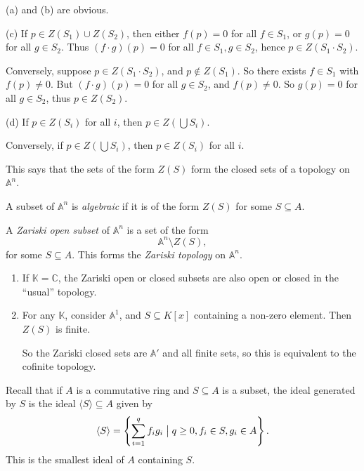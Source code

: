 \documentclass[12pt]{article}
\begin{document}
\begin{proofbox}


	(a) and (b) are obvious.

	(c) If $p \in Z(S_1) \cup Z(S_2)$, then either $f(p) = 0$ for all $f \in S_1$, or $g(p) = 0$ for all $g \in S_2$. Thus $(f \cdot g)(p) = 0$ for all $f \in S_1, g \in S_2$, hence $p \in Z(S_1 \cdot S_2)$.

	Conversely, suppose $p \in Z(S_1 \cdot S_2)$, and $p \not \in Z(S_1)$. So there exists $f \in S_1$ with $f(p) \neq 0$. But $(f \cdot g)(p) = 0$ for all $g \in S_2$, and $f(p) \neq 0$. So $g(p) = 0$ for all $g \in S_2$, thus $p \in Z(S_2)$.

	(d) If $p \in Z(S_i)$ for all $i$, then $p \in Z(\bigcup S_i)$.

	Conversely, if $p \in Z(\bigcup S_i)$, then $p \in Z(S_i)$ for all $i$.
\end{proofbox}

This says that the sets of the form $Z(S)$ form the closed sets of a topology on $\mathbb{A}^n$.

\begin{definition}
	A subset of $\mathbb{A}^n$ is \emph{algebraic} if it is of the form $Z(S)$ for some $S \subseteq A$.

	A \emph{Zariski open subset} of $\mathbb{A}^n$ is a set of the form
	\[
	\mathbb{A}^n \setminus Z(S),
	\]
	for some $S \subseteq A$. This forms the \emph{Zariski topology} on $\mathbb{A}^n$.
\end{definition}

\begin{exbox}
	\begin{enumerate}
		\item If $\mathbb{K} = \mathbb{C}$, the Zariski open or closed subsets are also open or closed in the ``usual'' topology.
		\item For any $\mathbb{K}$, consider $\mathbb{A}^1$, and $S \subseteq K[x]$ containing a non-zero element. Then $Z(S)$ is finite.

			So the Zariski closed sets are $\mathbb{A}'$ and all finite sets, so this is equivalent to the cofinite topology.
	\end{enumerate}	
\end{exbox}

Recall that if $A$ is a commutative ring and $S \subseteq A$ is a subset, the ideal generated by $S$ is the ideal $\langle S \rangle \subseteq A$ given by
\[
	\langle S \rangle = \left\{ \sum_{i = 1}^q f_i g_i \bigm| q \geq 0, f_i \in S, g_i \in A\right\}.
\]
This is the smallest ideal of $A$ containing $S$.
\end{document}

